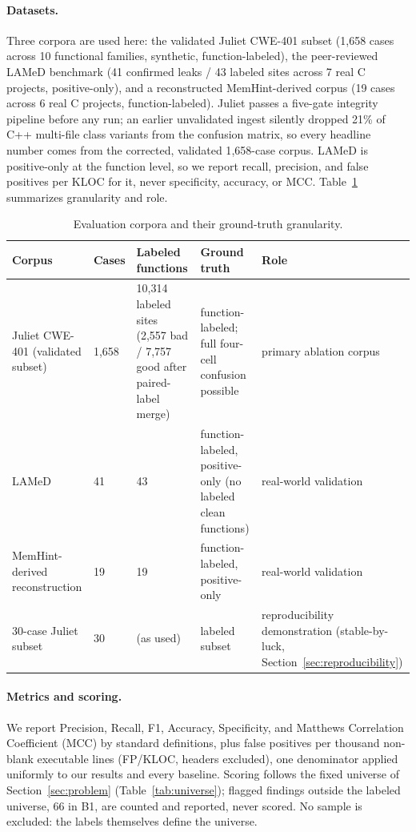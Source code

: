 \documentclass[a4paper]{llncs}
\begin{document}
\paragraph{Datasets.} Three corpora are used here: the validated Juliet
CWE-401 subset (1{,}658 cases across 10 functional families, synthetic,
function-labeled), the peer-reviewed LAMeD benchmark (41 confirmed leaks /
43 labeled sites across 7 real C projects, positive-only), and a
reconstructed
MemHint-derived corpus (19 cases across 6 real C projects,
function-labeled). Juliet passes a five-gate integrity pipeline before
any run; an earlier unvalidated ingest silently dropped 21\%
of C++ multi-file class variants from the confusion matrix, so every
headline number comes from the corrected, validated 1{,}658-case
corpus.
LAMeD is positive-only at the function level, so we report recall,
precision, and false positives per KLOC for it, never specificity,
accuracy, or MCC. Table~\ref{tab:corpora} summarizes granularity and role.

\begin{table}[htbp]
\centering
\caption{Evaluation corpora and their ground-truth granularity.}
\label{tab:corpora}
\footnotesize
\begin{tabular}{@{}p{2.7cm}p{0.9cm}p{1.9cm}p{3.0cm}p{2.0cm}@{}}
\toprule
Corpus & Cases & Labeled functions & Ground truth & Role \\
\midrule
Juliet CWE-401 (validated subset) & 1{,}658 & 10{,}314 labeled sites (2{,}557 bad / 7{,}757 good after paired-label merge) & function-labeled; full four-cell confusion possible & primary ablation corpus \\
LAMeD & 41 & 43 & function-labeled, positive-only (no labeled clean functions) & real-world validation \\
MemHint-derived reconstruction & 19 & 19 & function-labeled, positive-only & real-world validation \\
30-case Juliet subset & 30 & (as used) & labeled subset & reproducibility demonstration (stable-by-luck, Section~\ref{sec:reproducibility}) \\
\bottomrule
\end{tabular}
\end{table}

\paragraph{Metrics and scoring.} We report Precision, Recall, F1,
Accuracy, Specificity, and Matthews Correlation Coefficient (MCC) by
standard definitions, plus false
positives per thousand non-blank executable lines (FP/KLOC, headers
excluded), one denominator applied uniformly to our results and every
baseline. Scoring follows the fixed universe of
Section~\ref{sec:problem} (Table~\ref{tab:universe}); flagged findings
outside the labeled universe, 66 in B1, are counted and reported, never
scored. No sample is excluded: the labels themselves
define the universe.
\end{document}
